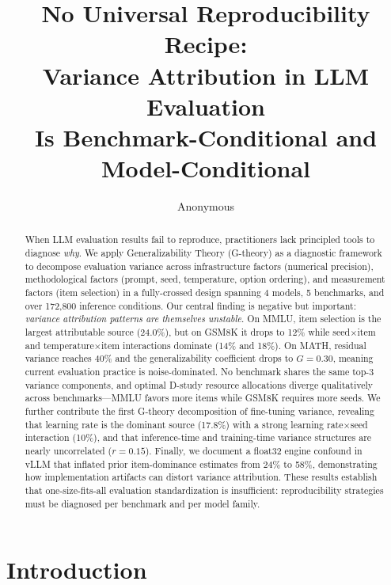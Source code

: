 \documentclass[letterpaper]{article}
\title{No Universal Reproducibility Recipe:\\Variance Attribution in LLM Evaluation\\Is Benchmark-Conditional and Model-Conditional}
\author{Anonymous}
\date{}
\begin{document}
\maketitle

\begin{abstract}
When LLM evaluation results fail to reproduce, practitioners lack principled tools to diagnose \emph{why}.
We apply Generalizability Theory (G-theory) as a diagnostic framework to decompose evaluation variance across infrastructure factors (numerical precision), methodological factors (prompt, seed, temperature, option ordering), and measurement factors (item selection) in a fully-crossed design spanning 4 models, 5 benchmarks, and over 172{,}800 inference conditions.
Our central finding is negative but important: \emph{variance attribution patterns are themselves unstable}.
On MMLU, item selection is the largest attributable source (24.0\%), but on GSM8K it drops to 12\% while seed$\times$item and temperature$\times$item interactions dominate (14\% and 18\%).
On MATH, residual variance reaches 40\% and the generalizability coefficient drops to $G=0.30$, meaning current evaluation practice is noise-dominated.
No benchmark shares the same top-3 variance components, and optimal D-study resource allocations diverge qualitatively across benchmarks---MMLU favors more items while GSM8K requires more seeds.
We further contribute the first G-theory decomposition of fine-tuning variance, revealing that learning rate is the dominant source (17.8\%) with a strong learning rate$\times$seed interaction (10\%), and that inference-time and training-time variance structures are nearly uncorrelated ($r=0.15$).
Finally, we document a float32 engine confound in vLLM that inflated prior item-dominance estimates from 24\% to 58\%, demonstrating how implementation artifacts can distort variance attribution.
These results establish that one-size-fits-all evaluation standardization is insufficient: reproducibility strategies must be diagnosed per benchmark and per model family.
\end{abstract}


\section{Introduction}
\end{document}
